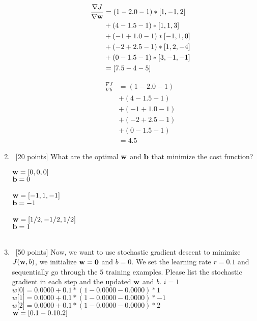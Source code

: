 \documentclass[12pt, fullpage,letterpaper]{article}
\begin{document}
\begin{enumerate}
\begin{enumerate}
\begin{align*}
    \frac{\nabla J}{\nabla {\bf w}} &=
    (1 - 2.0 - 1) * [1,-1,2]\\
    &+ (4 - 1.5 - 1) * [1,1,3]\\
    &+ (-1 + 1.0 - 1) * [-1,1,0]\\
    &+ (-2 + 2.5 - 1) * [1,2,-4]\\
    &+ (0 - 1.5 - 1) * [3,-1,-1]\\
    &= [ 7.5 -4  -5 ]
\end{align*}

\begin{align*}
    \frac{\nabla J}{\nabla b} &=
    (1 - 2.0 - 1)\\
    &+ (4 - 1.5 - 1)\\
    &+ (-1 + 1.0 - 1)\\
    &+ (-2 + 2.5 - 1)\\
    &+ (0 - 1.5 - 1)\\
    &= 4.5
\end{align*}

%
%



\end{enumerate}
\item~[20 points] What are the optimal ${\bf w}$ and ${\bf b}$ that minimize the cost function?

    ${\bf w} = [0,0,0]$\\
    ${\bf b} = 0$\\\\
    ${\bf w} = [-1,1,-1]$\\
    ${\bf b} = -1$\\\\
    ${\bf w} = [1/2,-1/2,1/2]$\\
    ${\bf b} = 1$\\\\

\item~[50 points] Now, we want to use stochastic gradient descent to minimize $J({\bf w}, b)$, we initialize ${\bf w} = {\bf 0}$ and $b = 0$. We set the learning rate $r = 0.1$ and sequentially go through the $5$ training examples. Please list the stochastic gradient in each step and the updated ${\bf w}$ and $b$.
$i = 1$\\
$w\big[0\big] = 0.0000 + 0.1*(1 - 0.0000 - 0.0000)*1$\\
$w\big[1\big] = 0.0000 + 0.1*(1 - 0.0000 - 0.0000)*-1$\\
$w\big[2\big] = 0.0000 + 0.1*(1 - 0.0000 - 0.0000)*2$\\
${\bf w} = [ 0.1 -0.1  0.2]$\\


\end{enumerate}
\end{document}
